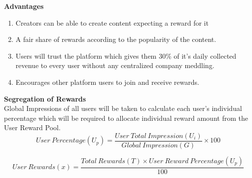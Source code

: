 \documentclass[10pt]{article}
\begin{document}
\textbf{Advantages}\\

\begin{enumerate}[leftmargin=+0.2in]
\item Creators can be able to create content expecting a reward for it
\item A fair share of rewards according to the popularity of the content.
\item Users will trust the platform which gives them 30\% of it’s daily collected revenue to every user without any centralized company meddling.
\item Encourages other platform users to join and receive rewards.
\end{enumerate}


\textbf{Segregation of Rewards}\\

Global Impressions of all users will be taken to calculate each user’s individual percentage which will be required to allocate individual reward amount from the User Reward Pool.\\

\begin{equation}
User\:Percentage(U_p)=\frac{User\:Total\:Impression(U_i)}{Global\:Impression(G)} \times 100
\end{equation}

\begin{equation}
User\:Rewards(x)=\frac{Total\:Rewards(T) \times User\:Reward\:Percentage(U_p)}{100}
\end{equation}\\
\end{document}
